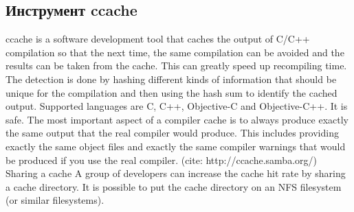 \subsection{Инструмент ccache}
ccache is a software development tool that caches the output of C/C++ compilation so that the next time, the same compilation can be avoided and the results can be taken from the cache. This can greatly speed up recompiling time. The detection is done by hashing different kinds of information that should be unique for the compilation and then using the hash sum to identify the cached output. Supported languages are C, C++, Objective-C and Objective-C++. It is safe. The most important aspect of a compiler cache is to always produce exactly the same output that the real compiler would produce. This includes providing exactly the same object files and exactly the same compiler warnings that would be produced if you use the real compiler. (cite: http://ccache.samba.org/)
Sharing a cache
A group of developers can increase the cache hit rate by sharing a cache directory. It is possible to put the cache directory on an NFS filesystem (or similar filesystems).